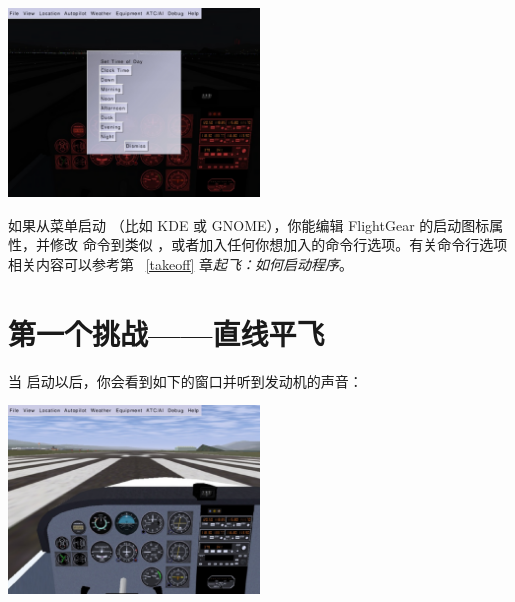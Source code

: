 \begin{center}
\includegraphics[width=0.5\textwidth]{img/tut_5}
\end{center}
\ifchinese
如果从菜单启动 \FlightGear{}（比如 KDE 或 GNOME），你能编辑 FlightGear 的启动图标属性，并修改  命令到类似 ，或者加入任何你想加入的命令行选项。有关命令行选项相关内容可以参考第 ~\ref{takeoff} 章\textit{起飞：如何启动程序}。
\fi

{}


\ifchinese
\section{第一个挑战——直线平飞}\label{sec:FlyingStraight}

当 \FlightGear{} 启动以后，你会看到如下的窗口并听到发动机的声音：

\begin{center}
\includegraphics[width=0.5\textwidth]{img/tut_6}
\end{center}

